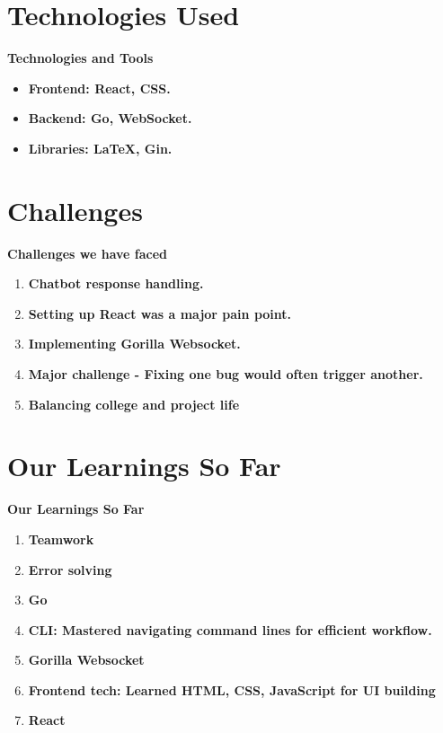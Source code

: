 \documentclass{beamer}
\begin{document}
\section{Technologies Used}

\begin{frame}{\bfseries Technologies and Tools}
    \begin{itemize}
        \item \bfseries Frontend: React, CSS.
        \item \bfseries Backend: Go, WebSocket.
        \item \bfseries Libraries: LaTeX, Gin.
    \end{itemize}
\end{frame}

\section{Challenges}

\begin{frame}{\bfseries Challenges we have faced}
    \begin{enumerate}
        \item \bfseries Chatbot response handling.
        \item \bfseries Setting up React was a major pain point.
        \item \bfseries Implementing Gorilla Websocket.
        \item \bfseries Major challenge - Fixing one bug would often trigger another. 
        \item \bfseries Balancing college and project life
        
    \end{enumerate}
\end{frame}

\section{Our Learnings So Far}

\begin{frame}{\bfseries Our Learnings So Far}
    \begin{enumerate}
        \item \bfseries Teamwork 
        \item \bfseries Error solving
        \item \bfseries Go 
        \item \bfseries CLI: Mastered navigating command lines for efficient workflow. 
        \item \bfseries Gorilla Websocket
        \item \bfseries Frontend tech: Learned HTML, CSS, JavaScript for UI building 
        \item \bfseries React
        
    \end{enumerate}
\end{frame}
\end{document}

